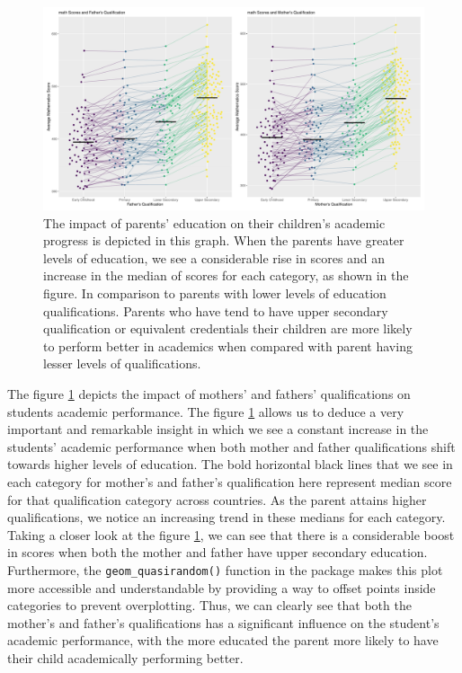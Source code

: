\begin{Schunk}
\begin{figure}[H]
\includegraphics[width=1\linewidth]{learningtower_files/figure-latex/qual-plot-1} \caption[The impact of parents' education on their children's academic progress is depicted in this graph]{The impact of parents' education on their children's academic progress is depicted in this graph. When the parents have greater levels of education, we see a considerable rise in scores and an increase in the median of scores for each category, as shown in the figure. In comparison to parents with lower levels of education qualifications. Parents who have tend to have upper secondary qualification or equivalent credentials their children are more likely to perform better in academics when compared with parent having lesser levels of qualifications.}\label{fig:qual-plot}
\end{figure}
\end{Schunk}

The figure \ref{fig:qual-plot} depicts the impact of mothers' and
fathers' qualifications on students academic performance. The figure
\ref{fig:qual-plot} allows us to deduce a very important and remarkable
insight in which we see a constant increase in the students' academic
performance when both mother and father qualifications shift towards
higher levels of education. The bold horizontal black lines that we see
in each category for mother's and father's qualification here represent
median score for that qualification category across countries. As the
parent attains higher qualifications, we notice an increasing trend in
these medians for each category. Taking a closer look at the figure
\ref{fig:qual-plot}, we can see that there is a considerable boost in
scores when both the mother and father have upper secondary education.
Furthermore, the \texttt{geom\_quasirandom()} function in the
 \citep{ggbeeswarm} package makes this plot more
accessible and understandable by providing a way to offset points inside
categories to prevent overplotting. Thus, we can clearly see that both
the mother's and father's qualifications has a significant influence on
the student's academic performance, with the more educated the parent
more likely to have their child academically performing better.


